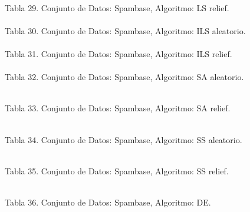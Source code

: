 \documentclass{ci5652}
\begin{document}
%
\\
Tabla 29. Conjunto de Datos: Spambase, Algoritmo: LS relief.\\

\begin{adjustbox}{width=\columnwidth, center=\columnwidth}
%
\\
\end{adjustbox}
Tabla 30. Conjunto de Datos: Spambase, Algoritmo: ILS aleatorio.\\

\begin{adjustbox}{width=\columnwidth, center=\columnwidth}
%
\\
\end{adjustbox}
Tabla 31. Conjunto de Datos: Spambase, Algoritmo: ILS relief.\\

\begin{adjustbox}{width=\columnwidth, center=\columnwidth}
%
\\
\end{adjustbox}
Tabla 32. Conjunto de Datos: Spambase, Algoritmo: SA aleatorio.

\begin{adjustbox}{width=\columnwidth, center=\columnwidth}
%
\\
\end{adjustbox}
Tabla 33. Conjunto de Datos: Spambase, Algoritmo: SA relief.

%
\\
Tabla 34. Conjunto de Datos: Spambase, Algoritmo: SS aleatorio.

%
\\
Tabla 35. Conjunto de Datos: Spambase, Algoritmo: SS relief.

%
\\
Tabla 36. Conjunto de Datos: Spambase, Algoritmo: DE.
\end{document}

